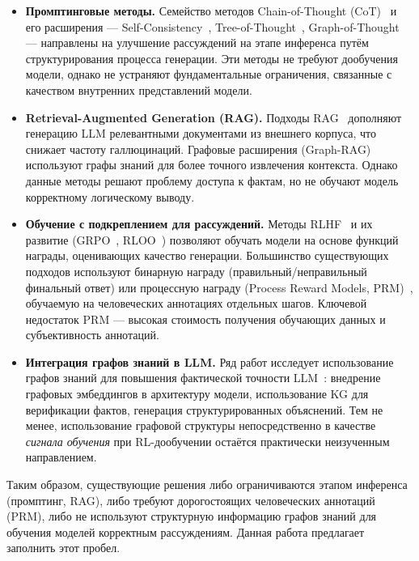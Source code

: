 \begin{itemize}
    \item \textbf{Промптинговые методы.} Семейство методов Chain-of-Thought (CoT)~\cite{wei2022chain} и его расширения --- Self-Consistency~\cite{wang2023selfconsistency}, Tree-of-Thought~\cite{yao2023tree}, Graph-of-Thought~\cite{besta2024graph} --- направлены на улучшение рассуждений на этапе инференса путём структурирования процесса генерации. Эти методы не требуют дообучения модели, однако не устраняют фундаментальные ограничения, связанные с качеством внутренних представлений модели.

    \item \textbf{Retrieval-Augmented Generation (RAG).} Подходы RAG~\cite{lewis2020retrieval} дополняют генерацию LLM релевантными документами из внешнего корпуса, что снижает частоту галлюцинаций. Графовые расширения (Graph-RAG) используют графы знаний для более точного извлечения контекста. Однако данные методы решают проблему доступа к фактам, но не обучают модель корректному логическому выводу.

    \item \textbf{Обучение с подкреплением для рассуждений.} Методы RLHF~\cite{ouyang2022training} и их развитие (GRPO~\cite{shao2024deepseekmath}, RLOO~\cite{ahmadian2024rloo}) позволяют обучать модели на основе функций награды, оценивающих качество генерации. Большинство существующих подходов используют бинарную награду (правильный/неправильный финальный ответ) или процессную награду (Process Reward Models, PRM)~\cite{lightman2023lets}, обучаемую на человеческих аннотациях отдельных шагов. Ключевой недостаток PRM --- высокая стоимость получения обучающих данных и субъективность аннотаций.

    \item \textbf{Интеграция графов знаний в LLM.} Ряд работ исследует использование графов знаний для повышения фактической точности LLM~\cite{pan2024unifying}: внедрение графовых эмбеддингов в архитектуру модели, использование KG для верификации фактов, генерация структурированных объяснений. Тем не менее, использование графовой структуры непосредственно в качестве \textit{сигнала обучения} при RL-дообучении остаётся практически неизученным направлением.
\end{itemize}

Таким образом, существующие решения либо ограничиваются этапом инференса (промптинг, RAG), либо требуют дорогостоящих человеческих аннотаций (PRM), либо не используют структурную информацию графов знаний для обучения моделей корректным рассуждениям. Данная работа предлагает заполнить этот пробел.

